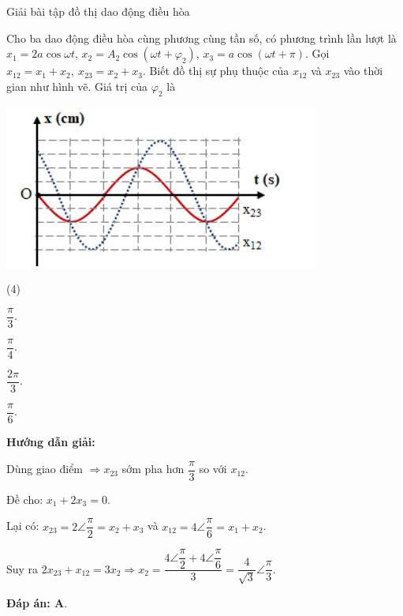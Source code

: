 \begin{dang}{Giải bài tập đồ thị dao động điều hòa}
	{
		Cho ba dao động điều hòa cùng phương cùng tần số, có phương trình lần lượt là $x_1=2a\cos \omega t$, $x_2=A_2\cos \left( \omega t+\varphi_2\right) $, $x_3=a\cos \left( \omega t+\pi\right) $. Gọi $x_{12}=x_1+x_2, \ x_{23}=x_2+x_3$. Biết đồ thị sự phụ thuộc của $x_{12}$ và $x_{23}$ vào thời gian như hình vẽ. Giá trị của $\varphi_2$ là	
		\begin{center}
			\includegraphics[scale=0.8]{../figs/VN12-PH-06-A-004-2-V2-06.jpg}
		\end{center}	
		\begin{mcq}(4)
			\item $\dfrac{\pi}{3}$.
			\item  $\dfrac{\pi}{4}$.
			\item  $\dfrac{2\pi}{3}$.
			\item  $\dfrac{\pi}{6}$.
		\end{mcq}	
	}{
		\begin{center}
			\textbf{Hướng dẫn giải:}
		\end{center}
		
		Dùng giao điểm $\Rightarrow x_{23}$ sớm pha hơn $\dfrac{\pi}{3}$ so với $x_{12}$.
		
		Đề cho: $x_1+2x_3=0$.
		
		Lại có: $x_{23}=2\angle \dfrac{\pi}{2}=x_2+x_3$ và $x_{12}=4\angle \dfrac{\pi}{6}=x_1+x_2$.
		
		Suy ra $2x_{23}+x_{12}=3x_2\Rightarrow x_2=\dfrac{4\angle \dfrac{\pi}{2}+4\angle \dfrac{\pi}{6}}{3}=\dfrac{4}{\sqrt{3}}\angle \dfrac{\pi}{3}$.
		
		\textbf{Đáp án: A}.
		
	}
	
\end{dang}